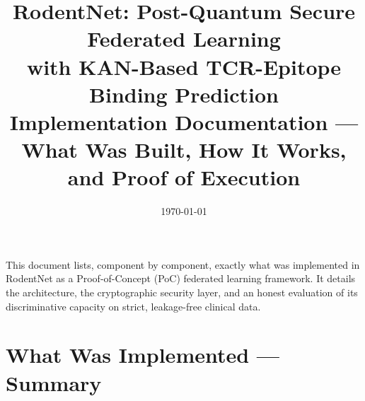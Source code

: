 \documentclass[11pt,a4paper]{article}
\title{\vspace{-1.5cm}\textbf{RodentNet: Post-Quantum Secure Federated Learning\\with KAN-Based TCR-Epitope Binding Prediction}\\[2pt]
\large Implementation Documentation --- What Was Built, How It Works, and Proof of Execution}
\date{\today}
\begin{document}
\maketitle
\thispagestyle{fancy}

\noindent This document lists, component by component, exactly what was implemented in RodentNet as a Proof-of-Concept (PoC) federated learning framework. It details the architecture, the cryptographic security layer, and an honest evaluation of its discriminative capacity on strict, leakage-free clinical data. 

\tableofcontents
\listoffigures

\section{What Was Implemented --- Summary}
\end{document}
